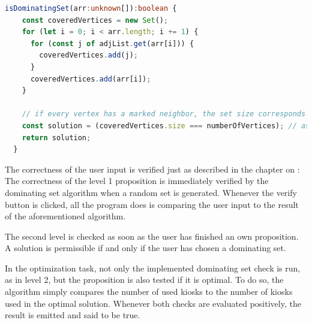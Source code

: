 \begin{lstlisting}[language=TypeScript,caption={},label={lst:isDominatingSet}]
  isDominatingSet(arr:unknown[]):boolean {
    const coveredVertices = new Set();
    for (let i = 0; i < arr.length; i += 1) {
      for (const j of adjList.get(arr[i])) {
        coveredVertices.add(j);
      }
      coveredVertices.add(arr[i]);
    }

    // if every vertex has a marked neighbor, the set size corresponds to the total number of vertices
    const solution = (coveredVertices.size === numberOfVertices); // assigns a boolean value
    return solution;
  }
\end{lstlisting}

The correctness of the user input is verified just as described in the chapter on : The correctness of the level 1 proposition is immediately verified by the dominating set algorithm when a random set is generated. Whenever the verify button is clicked, all the program does is comparing the user input to the result of the aforementioned algorithm.

The second level is checked as soon as the user has finished an own proposition. A solution is permissible if and only if the user has chosen a dominating set.

In the optimization task, not only the implemented dominating set check is run, as in level 2, but the proposition is also tested if it is optimal. To do so, the algorithm simply compares the number of used kiosks to the number of kiosks used in the optimal solution. Whenever both checks are evaluated positively, the result is emitted and said to be true.